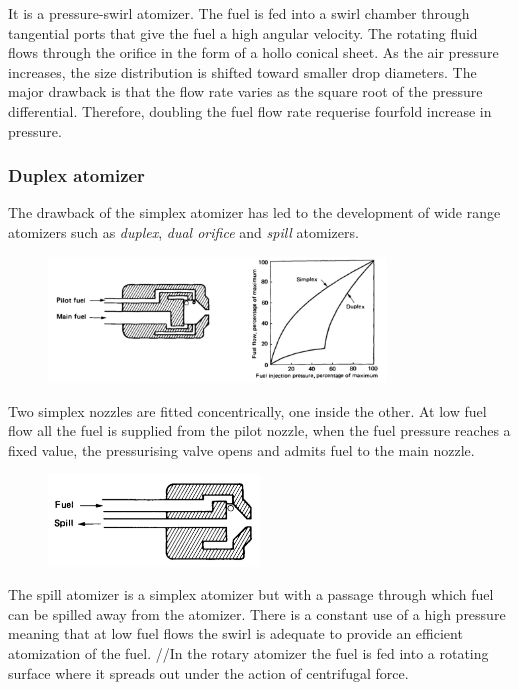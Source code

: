 \documentclass[12pt]{article}
\begin{document}
It is a pressure-swirl atomizer. The fuel is fed into a swirl chamber through tangential ports that give the fuel a high angular velocity. The rotating fluid flows through the orifice in the form of a hollo conical sheet. As the air pressure increases, the size distribution is shifted toward smaller drop diameters. The major drawback is that the flow rate varies as the square root of the pressure differential. Therefore, doubling the fuel flow rate requerise fourfold increase in pressure.

\subsubsection{Duplex atomizer}

The drawback of the simplex atomizer has led to the development of wide range atomizers such as \textit{duplex}, \textit{dual orifice} and \textit{spill} atomizers.

\begin{figure}[!ht]
\centering
\includegraphics[width=0.8\textwidth]{figures/duplex.png}
\end{figure}

Two simplex nozzles are fitted concentrically, one inside the other. At low fuel flow all the fuel is supplied from the pilot nozzle, when the fuel pressure reaches a fixed value, the pressurising valve opens and admits fuel to the main nozzle.

\begin{figure}[!ht]
\centering
\includegraphics[width=0.5\textwidth]{figures/spill.png}
\end{figure}

The spill atomizer is a simplex atomizer but with a passage through which fuel can be spilled away from the atomizer. There is a constant use of a high pressure meaning that at low fuel flows the swirl is adequate to provide an efficient atomization of the fuel.
//In the rotary atomizer the fuel is fed into a rotating surface where it spreads out under the action of centrifugal force.
\end{document}
